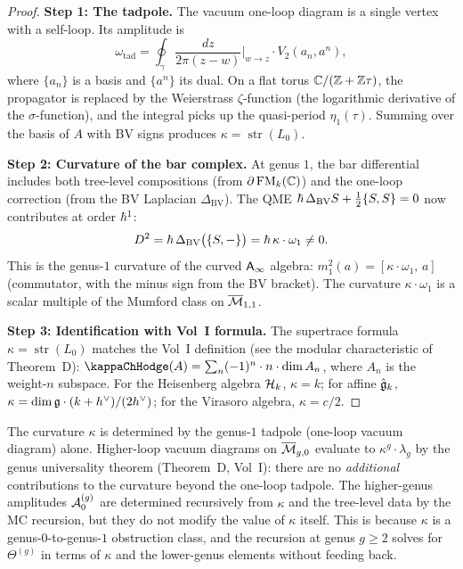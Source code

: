 \begin{proof}
\textbf{Step 1: The tadpole.}
The vacuum one-loop diagram is a single vertex with a self-loop.
Its amplitude is
\[
\omega_{\mathrm{tad}}
= \oint_{\gamma} \frac{dz}{2\pi(z - w)}\bigg|_{w \to z}
\cdot V_2(a_n, a^n),
\]
where $\{a_n\}$ is a basis and $\{a^n\}$ its dual. On a flat
torus $\mathbb{C} / (\mathbb{Z} + \mathbb{Z}\tau)$, the propagator is replaced by the
Weierstrass $\zeta$-function (the logarithmic derivative of the
$\sigma$-function), and the integral picks up the quasi-period
$\eta_1(\tau)$. Summing over the basis of $A$ with BV signs
produces $\kappa = \operatorname{str}(L_0)$.

\medskip\noindent\textbf{Step 2: Curvature of the bar complex.}
At genus $1$, the bar differential includes both tree-level
compositions (from $\partial\operatorname{FM}_k(\mathbb{C})$) and the one-loop
correction (from the BV Laplacian $\Delta_{\mathrm{BV}}$).
The QME $\hbar\,\Delta_{\mathrm{BV}}S + \tfrac{1}{2}\{S,S\} = 0$
now contributes at order $\hbar^1$:
\[
D^2 = \hbar\,\Delta_{\mathrm{BV}}\bigl(\{S, -\}\bigr)
= \hbar\,\kappa \cdot \omega_1 \ne 0.
\]
This is the genus-$1$ curvature of the curved $\mathsf{A}_{\infty}$ algebra:
$m_1^2(a) = [\kappa \cdot \omega_1,\, a]$ (commutator, with the
minus sign from the BV bracket). The curvature $\kappa \cdot
\omega_1$ is a scalar multiple of the Mumford class on
$\overline{\mathcal{M}}_{1,1}$.

\medskip\noindent\textbf{Step 3: Identification with
Vol~I formula.}
The supertrace formula $\kappa = \operatorname{str}(L_0)$ matches
the Vol~I definition (see the modular characteristic of
Theorem~D): $\kappaChHodge(A) = \sum_n (-1)^n \cdot n \cdot
\dim A_n$, where $A_n$ is the weight-$n$ subspace. For the
Heisenberg algebra $\mathcal{H}_k$, $\kappa = k$; for affine
$\hat{\mathfrak{g}}_k$, $\kappa = \dim\mathfrak{g} \cdot (k + h^\vee) / (2h^\vee)$; for the
Virasoro algebra, $\kappa = c/2$.
\end{proof}

\begin{remark}
The curvature $\kappa$ is determined by the genus-$1$ tadpole
(one-loop vacuum diagram) alone. Higher-loop vacuum diagrams
on $\overline{\mathcal{M}}_{g,0}$ evaluate to $\kappa^g \cdot \lambda_g$
by the genus universality theorem (Theorem~D, Vol~I): there are
no \emph{additional} contributions to the curvature beyond the
one-loop tadpole. The higher-genus amplitudes $\mathcal{A}^{(g)}_0$
are determined recursively from $\kappa$ and the tree-level data
by the MC recursion, but they do not modify the value of $\kappa$
itself. This is because $\kappa$ is a genus-$0$-to-genus-$1$
obstruction class, and the recursion at genus $g \geq 2$ solves
for $\Theta^{(g)}$ in terms of $\kappa$ and the lower-genus
elements without feeding back.
\end{remark}

